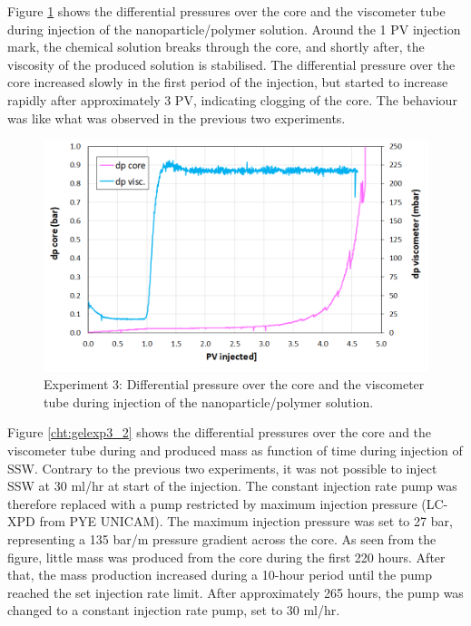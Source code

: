 Figure \ref{cht:gelexp3_1} shows the differential pressures over the core and the viscometer tube during injection of the nanoparticle/polymer solution. Around the 1 PV injection mark, the chemical solution breaks through the core, and shortly after, the viscosity of the produced solution is stabilised. The differential pressure over the core increased slowly in the first period of the injection, but started to increase rapidly after approximately 3 PV, indicating clogging of the core. The behaviour was like what was observed in the previous two experiments.



\begin{figure}[h!]
    \centering
    \includegraphics[width=\textwidth]{img/cht/gelexp3_1.png}
    \caption{Experiment 3: Differential pressure over the core and the viscometer tube during injection of the nanoparticle/polymer solution.}
    \label{cht:gelexp3_1} %
\end{figure}

Figure \ref{cht:gelexp3_2} shows the differential pressures over the core and the viscometer tube during and produced mass as function of time during injection of SSW. Contrary to the previous two experiments, it was not possible to inject SSW at 30 ml/hr at start of the injection. The constant injection rate pump was therefore replaced with a pump restricted by maximum injection pressure (LC-XPD from PYE UNICAM). The maximum injection pressure was set to 27 bar, representing a 135 bar/m pressure gradient across the core. As seen from the figure, little mass was produced from the core during the first 220 hours. After that, the mass production increased during a 10-hour period until the pump reached the set injection rate limit. After approximately 265 hours, the pump was changed to a constant injection rate pump, set to 30 ml/hr.

